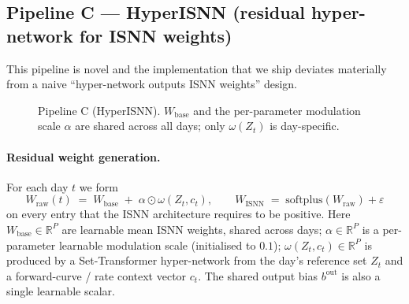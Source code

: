 \documentclass[11pt,a4paper]{article}
\begin{document}
\subsection{Pipeline C --- HyperISNN (residual hyper-network for ISNN
weights)}
\label{sec:pipeC}

This pipeline is novel and the implementation that we ship deviates
materially from a naive ``hyper-network outputs ISNN weights'' design.

\begin{figure}[H]
\centering
{}
\caption{Pipeline C (HyperISNN). $W_{\mathrm{base}}$ and the per-parameter
modulation scale $\alpha$ are shared across all days; only $\omega(Z_t)$ is
day-specific.}
\end{figure}

\paragraph{Residual weight generation.} For each day $t$ we form
\[
W_{\mathrm{raw}}(t) \;=\; W_{\mathrm{base}} \;+\; \alpha \odot \omega(Z_t,c_t),
\qquad
W_{\mathrm{ISNN}} \;=\; \mathrm{softplus}(W_{\mathrm{raw}}) + \varepsilon
\]
on every entry that the ISNN architecture requires to be positive. Here
$W_{\mathrm{base}} \in \mathbb{R}^P$ are learnable mean ISNN weights, shared
across days; $\alpha \in \mathbb{R}^P$ is a per-parameter learnable
modulation scale (initialised to $0.1$); $\omega(Z_t, c_t) \in \mathbb{R}^P$
is produced by a Set-Transformer hyper-network from the day's reference set
$Z_t$ and a forward-curve / rate context vector $c_t$. The shared output
bias $b^{\mathrm{out}}$ is also a single learnable scalar.
\end{document}

